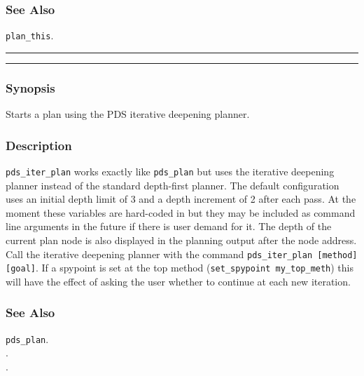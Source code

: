 \subsubsection*{See Also}
{\tt plan\_this}. \\

\vspace{2mm}
\hrule
\vspace{2mm}
\begin{Large}
\end{Large}
\vspace{2mm}
\hrule
\vspace{2mm}


\subsubsection*{Synopsis}
Starts a plan using the PDS iterative deepening planner.

\subsubsection*{Description}
{\tt pds\_iter\_plan} works exactly like {\tt pds\_plan} but uses the
iterative deepening planner instead of the standard depth-first
planner.  The default configuration uses an initial depth limit of 3
and a depth increment of 2 after each pass.  At the moment these
variables are hard-coded in but they may be included as command line
arguments in the future if there is user demand for it.  The depth of
the current plan node is also displayed in the planning output after the 
node address. \\

\noindent Call the iterative deepening planner with the command
\texttt{pds\_iter\_plan [method] [goal]}.  If a spypoint is set at the top
method (\texttt{set\_spypoint my\_top\_meth}) this will have the effect
of asking the user whether to continue at each new iteration.

\subsubsection*{See Also}
{\tt pds\_plan}. \\
. \\
. \\

